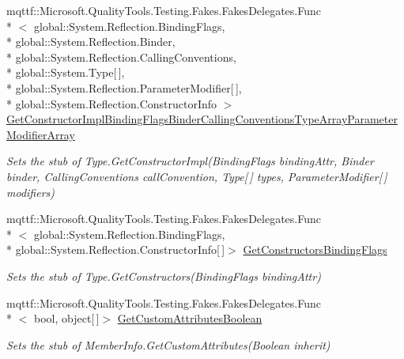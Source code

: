 \begin{DoxyCompactItemize}
mqttf\-::\-Microsoft.\-Quality\-Tools.\-Testing.\-Fakes.\-Fakes\-Delegates.\-Func\\*
$<$ global\-::\-System.\-Reflection.\-Binding\-Flags, \\*
global\-::\-System.\-Reflection.\-Binder, \\*
global\-::\-System.\-Reflection.\-Calling\-Conventions, \\*
global\-::\-System.\-Type\mbox{[}$\,$\mbox{]}, \\*
global\-::\-System.\-Reflection.\-Parameter\-Modifier\mbox{[}$\,$\mbox{]}, \\*
global\-::\-System.\-Reflection.\-Constructor\-Info $>$ \hyperlink{class_system_1_1_fakes_1_1_stub_type_a0e24bb569adc9f98d1711622886d3254}{Get\-Constructor\-Impl\-Binding\-Flags\-Binder\-Calling\-Conventions\-Type\-Array\-Parameter\-Modifier\-Array}
\begin{DoxyCompactList}\small\item\em Sets the stub of Type.\-Get\-Constructor\-Impl(\-Binding\-Flags binding\-Attr, Binder binder, Calling\-Conventions call\-Convention, Type\mbox{[}$\,$\mbox{]} types, Parameter\-Modifier\mbox{[}$\,$\mbox{]} modifiers)\end{DoxyCompactList}\item 
mqttf\-::\-Microsoft.\-Quality\-Tools.\-Testing.\-Fakes.\-Fakes\-Delegates.\-Func\\*
$<$ global\-::\-System.\-Reflection.\-Binding\-Flags, \\*
global\-::\-System.\-Reflection.\-Constructor\-Info\mbox{[}$\,$\mbox{]}$>$ \hyperlink{class_system_1_1_fakes_1_1_stub_type_a50c7e9dc7afe6625c4ca8f12eb78b762}{Get\-Constructors\-Binding\-Flags}
\begin{DoxyCompactList}\small\item\em Sets the stub of Type.\-Get\-Constructors(\-Binding\-Flags binding\-Attr)\end{DoxyCompactList}\item 
mqttf\-::\-Microsoft.\-Quality\-Tools.\-Testing.\-Fakes.\-Fakes\-Delegates.\-Func\\*
$<$ bool, object\mbox{[}$\,$\mbox{]}$>$ \hyperlink{class_system_1_1_fakes_1_1_stub_type_a7dff25f1dccac31bd57ff00e2633dd61}{Get\-Custom\-Attributes\-Boolean}
\begin{DoxyCompactList}\small\item\em Sets the stub of Member\-Info.\-Get\-Custom\-Attributes(\-Boolean inherit)\end{DoxyCompactList}\item 

\end{DoxyCompactItemize}
